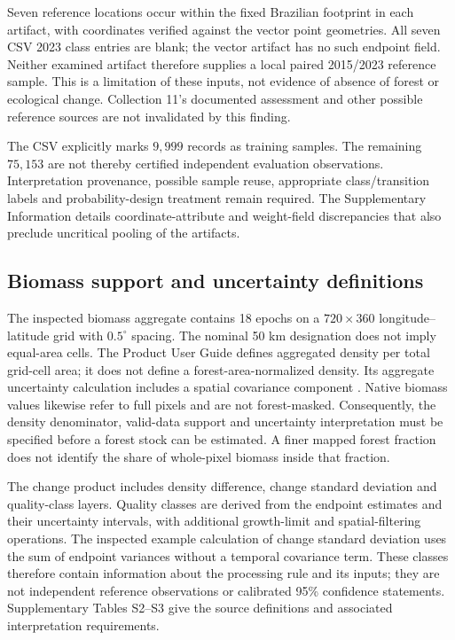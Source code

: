 \documentclass[11pt,a4paper]{article}
\begin{document}
Seven reference locations occur within the fixed Brazilian footprint in each artifact, with coordinates verified against the vector point geometries. All seven CSV 2023 class entries are blank; the vector artifact has no such endpoint field. Neither examined artifact therefore supplies a local paired 2015/2023 reference sample. This is a limitation of these inputs, not evidence of absence of forest or ecological change. Collection 11's documented assessment and other possible reference sources are not invalidated by this finding.

The CSV explicitly marks $9{,}999$ records as training samples. The remaining $75{,}153$ are not thereby certified independent evaluation observations. Interpretation provenance, possible sample reuse, appropriate class/transition labels and probability-design treatment remain required. The Supplementary Information details coordinate-attribute and weight-field discrepancies that also preclude uncritical pooling of the artifacts.

\subsection{Biomass support and uncertainty definitions}
The inspected biomass aggregate contains 18 epochs on a $720\times360$ longitude--latitude grid with $0.5^\circ$ spacing. The nominal 50 km designation does not imply equal-area cells. The Product User Guide defines aggregated density per total grid-cell area; it does not define a forest-area-normalized density. Its aggregate uncertainty calculation includes a spatial covariance component \citep{PUG2026}. Native biomass values likewise refer to full pixels and are not forest-masked. Consequently, the density denominator, valid-data support and uncertainty interpretation must be specified before a forest stock can be estimated. A finer mapped forest fraction does not identify the share of whole-pixel biomass inside that fraction.

The change product includes density difference, change standard deviation and quality-class layers. Quality classes are derived from the endpoint estimates and their uncertainty intervals, with additional growth-limit and spatial-filtering operations. The inspected example calculation of change standard deviation uses the sum of endpoint variances without a temporal covariance term. These classes therefore contain information about the processing rule and its inputs; they are not independent reference observations or calibrated 95\% confidence statements. Supplementary Tables S2--S3 give the source definitions and associated interpretation requirements.
\end{document}
